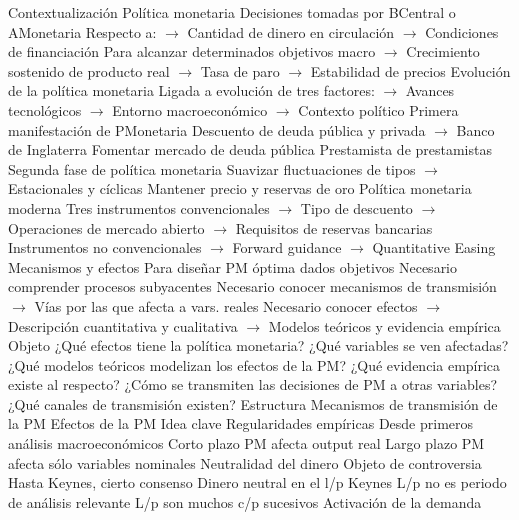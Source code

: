 \documentclass{nuevotema}
\begin{document}
\begin{esquemal}
	\1[] 
		\2 Contextualización
			\3 Política monetaria
				\4 Decisiones tomadas por BCentral o AMonetaria
				\4[] Respecto a:
				\4[] $\to$ Cantidad de dinero en circulación
				\4[] $\to$ Condiciones de financiación
				\4 Para alcanzar determinados objetivos macro
				\4[] $\to$ Crecimiento sostenido de producto real
				\4[] $\to$ Tasa de paro
				\4[] $\to$ Estabilidad de precios
			\3 Evolución de la política monetaria
				\4 Ligada a evolución de tres factores:
				\4[] $\to$ Avances tecnológicos
				\4[] $\to$ Entorno macroeconómico
				\4[] $\to$ Contexto político
				\4 Primera manifestación de PMonetaria
				\4[] Descuento de deuda pública y privada
				\4[] $\to$ Banco de Inglaterra
				\4[] Fomentar mercado de deuda pública
				\4[] Prestamista de prestamistas
				\4 Segunda fase de política monetaria
				\4[] Suavizar fluctuaciones de tipos
				\4[] $\to$ Estacionales y cíclicas
				\4[] Mantener precio y reservas de oro
				\4 Política monetaria moderna
				\4[] Tres instrumentos convencionales
				\4[] $\to$ Tipo de descuento
				\4[] $\to$ Operaciones de mercado abierto
				\4[] $\to$ Requisitos de reservas bancarias
				\4[] Instrumentos no convencionales
				\4[] $\to$ Forward guidance
				\4[] $\to$ Quantitative Easing
			\3 Mecanismos y efectos
				\4 Para diseñar PM óptima dados objetivos
				\4[] Necesario comprender procesos subyacentes
				\4 Necesario conocer mecanismos de transmisión
				\4[] $\to$ Vías por las que afecta a vars. reales
				\4 Necesario conocer efectos
				\4[] $\to$ Descripción cuantitativa y cualitativa
				\4[] $\to$ Modelos teóricos y evidencia empírica
		\2 Objeto
			\3 ¿Qué efectos tiene la política monetaria?
			\3 ¿Qué variables se ven afectadas?
			\3 ¿Qué modelos teóricos modelizan los efectos de la PM?
			\3 ¿Qué evidencia empírica existe al respecto?
			\3 ¿Cómo se transmiten las decisiones de PM a otras variables?
			\3 ¿Qué canales de transmisión existen?
		\2 Estructura
			\3 Mecanismos de transmisión de la PM
			\3 Efectos de la PM
	\1 
		\2 Idea clave
			\3 Regularidades empíricas
				\4 Desde primeros análisis macroeconómicos
				\4 Corto plazo
				\4[] PM afecta output real
				\4 Largo plazo
				\4[] PM afecta sólo variables nominales
			\3 Neutralidad del dinero
				\4 Objeto de controversia
				\4 Hasta Keynes, cierto consenso
				\4[] Dinero neutral en el l/p
				\4 Keynes
				\4[] L/p no es periodo de análisis relevante
				\4[] L/p son muchos c/p sucesivos
			\3 Activación de la demanda

\end{esquemal}
\end{document}
